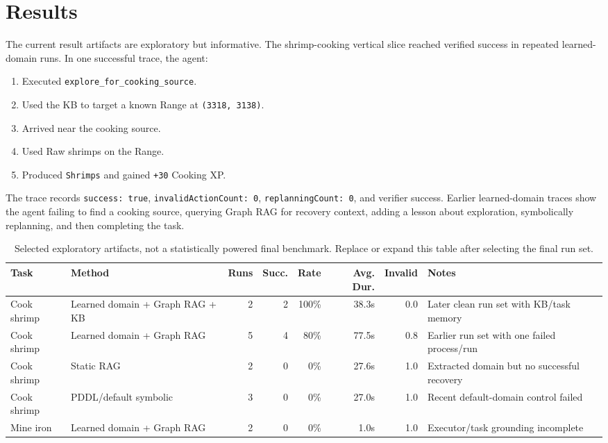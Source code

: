 \documentclass[10pt,twocolumn,letterpaper]{article}
\begin{document}
\section{Results}

The current result artifacts are exploratory but informative. The shrimp-cooking vertical slice reached verified success in repeated learned-domain runs. In one successful trace, the agent:

\begin{enumerate}
    \item Executed \texttt{explore\_for\_cooking\_source}.
    \item Used the KB to target a known Range at \texttt{(3318, 3138)}.
    \item Arrived near the cooking source.
    \item Used Raw shrimps on the Range.
    \item Produced \texttt{Shrimps} and gained \texttt{+30} Cooking XP.
\end{enumerate}

The trace  records \texttt{success: true}, \texttt{invalidActionCount: 0}, \texttt{replanningCount: 0}, and verifier success. Earlier learned-domain traces show the agent failing to find a cooking source, querying Graph RAG for recovery context, adding a lesson about exploration, symbolically replanning, and then completing the task.

\begin{table}[t]
\centering
\small
\begin{tabular}{llrrrrrl}
\toprule
\textbf{Task} & \textbf{Method} & \textbf{Runs} & \textbf{Succ.} & \textbf{Rate} & \textbf{Avg. Dur.} & \textbf{Invalid} & \textbf{Notes} \\
\midrule
Cook shrimp & Learned domain + Graph RAG + KB & 2 & 2 & 100\% & 38.3s & 0.0 & Later clean run set with KB/task memory \\
Cook shrimp & Learned domain + Graph RAG & 5 & 4 & 80\% & 77.5s & 0.8 & Earlier run set with one failed process/run \\
Cook shrimp & Static RAG & 2 & 0 & 0\% & 27.6s & 1.0 & Extracted domain but no successful recovery \\
Cook shrimp & PDDL/default symbolic & 3 & 0 & 0\% & 27.0s & 1.0 & Recent default-domain control failed \\
Mine iron & Learned domain + Graph RAG & 2 & 0 & 0\% & 1.0s & 1.0 & Executor/task grounding incomplete \\
\bottomrule
\end{tabular}
\caption{Selected exploratory artifacts, not a statistically powered final benchmark. Replace or expand this table after selecting the final run set.}
\label{tab:results}
\end{table}
\end{document}
